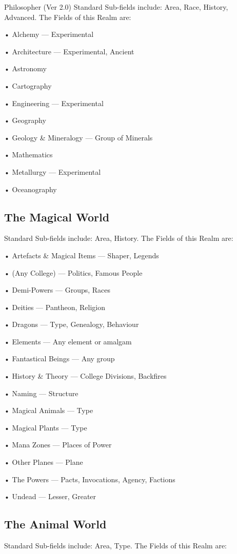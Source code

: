 \begin{Chapter}{Philosopher (Ver 2.0)}
Standard Sub-fields include: Area, Race, History, Advanced. The Fields
of this Realm are:

• Alchemy — Experimental  

• Architecture — Experimental, Ancient  

• Astronomy  

• Cartography  

• Engineering — Experimental  

• Geography  

• Geology \& Mineralogy — Group of Minerals  

• Mathematics  

• Metallurgy — Experimental  

• Oceanography 

\subsection{The Magical World}

Standard Sub-fields include: Area, History.  The Fields of this Realm
are:

• Artefacts \& Magical Items — Shaper, Legends  

• (Any College) — Politics, Famous People  

• Demi-Powers — Groups, Races  

• Deities — Pantheon, Religion  

• Dragons — Type, Genealogy, Behaviour  

• Elements — Any element or amalgam  

• Fantastical Beings — Any group  

•  History  \&  Theory  —  College  Divisions,  Backfires  

• Naming — Structure  

• Magical Animals — Type  

• Magical Plants — Type  

• Mana Zones — Places of Power  

• Other Planes — Plane  

•  The  Powers —  Pacts,  Invocations, Agency,  Factions  

• Undead — Lesser, Greater 

\subsection{The Animal World}

Standard Sub-fields include: Area, Type.  The Fields of this Realm
are:


\end{Chapter}
